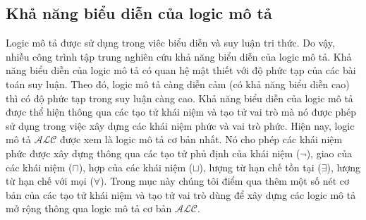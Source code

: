 \documentclass[12pt,a4paper,twoside]{report}
\newcommand{\ALC}		{$\mathcal{ALC}$\xspace}
\newcommand{\mand}		{\sqcap}
\newcommand{\mor}		{\sqcup}
\newcommand{\V}			{\forall}
\newcommand{\E}			{\exists}
\theoremstyle{definition}
\begin{document}
\subsection{Khả năng biểu diễn của logic mô tả}
Logic mô tả được sử dụng trong viêc biểu diễn và suy luận tri thức. Do vậy, nhiều công trình tập trung nghiên cứu khả năng biểu diễn của logic mô tả. Khả năng biểu diễn của logic mô tả có quan hệ mật thiết với độ phức tạp của các bài toán suy luận. Theo đó, logic mô tả càng diễn cảm (có khả năng biểu diễn cao) thì có độ phức tạp trong suy luận càng cao. Khả năng biểu diễn của logic mô tả được thể hiện thông qua các tạo tử khái niệm và tạo tử vai trò mà nó được phép sử dụng trong việc xây dựng các khái niệm phức và vai trò phức. 
Hiện nay, logic mô tả \ALC được xem là logic mô tả cơ bản nhất. Nó cho phép các khái niệm phức được xây dựng thông qua các tạo tử phủ định của khái niệm ($\neg$), giao của các khái niệm ($\mand$), hợp của các khái niệm ($\mor$), lượng từ hạn chế tồn tại ($\E$), lượng từ hạn chế với mọi ($\V$).
Trong mục này chúng tôi điểm qua thêm một số nét cơ bản của các tạo tử khái niệm và tạo tử vai trò dùng để xây dựng các logic mô tả mở rộng thông qua logic mô tả cơ bản \ALC.

\end{document}
